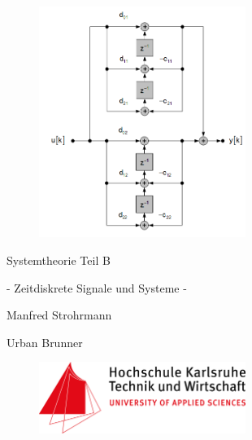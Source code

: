 \begin{figure}[H]
  \centerline{\includegraphics[width=0.6\textwidth]{SignalflussParallelstruktur.png}}
\end{figure}

\noindent \bigskip

\centerline  {\fontsize{50}{60}\selectfont Systemtheorie Teil B} 

\noindent \medskip

\centerline  {\fontsize{23}{30}\selectfont  - Zeitdiskrete Signale und Systeme -}

\noindent \bigskip
\noindent \bigskip

\centerline  {\fontsize{23}{30}\selectfont  Manfred Strohrmann}\medskip

\noindent 

\centerline  {\fontsize{23}{30}\selectfont Urban Brunner}

\vspace{6.0\baselineskip}

\begin{figure}[H]
  \centerline{\includegraphics[width=0.6\textwidth]{FH_Logo.png}}
\end{figure}

\clearpage